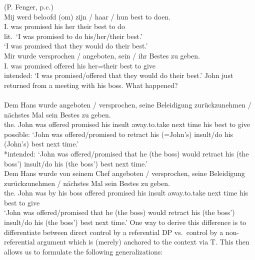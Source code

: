 \documentclass[output=paper]{langsci/langscibook}
\begin{document}
\ea\label{ex:23.10}
	\ea\label{ex:23.10a}  (P. Fenger, p.c.)\\
        \gll \llap{*}Mij  werd  beloofd  (om)  zijn / haar / hun  best  to doen.\\
            I.\Dat{}  was  promised  \hphantom{(}\Comp{}  his {} her {} their  best  to do\\
        \glt lit.\ ‘I was promised to do his/her/their best.’ \\
			‘I was promised that they would do their best.’
    \ex\label{ex:23.10b} \\
        \gll \llap{*}Mir  wurde  versprochen / angeboten,  sein / ihr  Bestes  zu geben.\\
            I.\Dat{}  was  promised {} offered  his {} her=their  best  to give\\
        \glt intended: ‘I was promised/offered that they would do their best.’
	\z
\ex\label{ex:23.11} John just returned from a meeting with his boss. What happened?\\
    \ea\label{ex:23.11a}\\
		\gll Dem Hans  wurde  angeboten / versprochen,  seine Beleidigung  zurückzunehmen  /  nächstes Mal  sein Bestes  zu geben.\\
            the.\Dat{} John  was  offered {} promised his insult  away.to.take {}  next time  his best  to give\\
		\glt possible: ‘John was offered/promised to retract his (=John’s) insult/do his (John’s) best next time.’\\
			*intended: ‘John was offered/promised that he (the boss) would retract his (the boss’) insult/do his (the boss’) best next time.’
    \ex\label{ex:23.11b} \\
		\gll Dem Hans  wurde  von seinem Chef  angeboten / versprochen, seine Beleidigung  zurückzunehmen  /  nächstes Mal  sein Bestes  zu geben.\\
         the.\Dat{} John  was  by his boss  offered {} promised his insult  away.to.take {}  next time  his best  to give\\
		\glt ‘John was offered/promised that he (the boss) would retract his
        (the boss') insult/do his (the boss’) best next time.’
	\z
\z
%
One way to derive this difference is to differentiate between direct control by
a referential DP vs.\ control by a non-referential argument which is (merely)
anchored to the context via T. This then allows us to formulate the following
generalizations:
\end{document}
